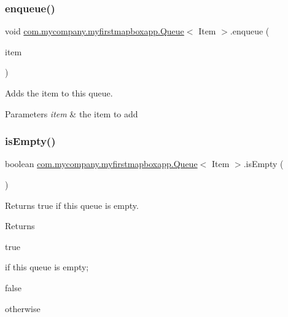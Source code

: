 \subsubsection{\texorpdfstring{enqueue()}{enqueue()}}
{\footnotesize\ttfamily void \hyperlink{classcom_1_1mycompany_1_1myfirstmapboxapp_1_1_queue}{com.\+mycompany.\+myfirstmapboxapp.\+Queue}$<$ Item $>$.enqueue (\begin{DoxyParamCaption}\item[{Item}]{item }\end{DoxyParamCaption})\hspace{0.3cm}{\ttfamily [inline]}}

Adds the item to this queue.


\begin{DoxyParams}{Parameters}
{\em item} & the item to add \\
\hline
\end{DoxyParams}
\mbox{\label{classcom_1_1mycompany_1_1myfirstmapboxapp_1_1_queue_add4126d7476d2b4cabb797cb158d7320}} 
\subsubsection{\texorpdfstring{is\+Empty()}{isEmpty()}}
{\footnotesize\ttfamily boolean \hyperlink{classcom_1_1mycompany_1_1myfirstmapboxapp_1_1_queue}{com.\+mycompany.\+myfirstmapboxapp.\+Queue}$<$ Item $>$.is\+Empty (\begin{DoxyParamCaption}{ }\end{DoxyParamCaption})\hspace{0.3cm}{\ttfamily [inline]}}

Returns true if this queue is empty.

\begin{DoxyReturn}{Returns}

\begin{DoxyCode}
\textcolor{keyword}{true} 
\end{DoxyCode}
 if this queue is empty;
\begin{DoxyCode}
\textcolor{keyword}{false} 
\end{DoxyCode}
 otherwise 
\end{DoxyReturn}
\mbox{\label{classcom_1_1mycompany_1_1myfirstmapboxapp_1_1_queue_a650e762b3bc9d365a2fc983a0066c5be}} 
